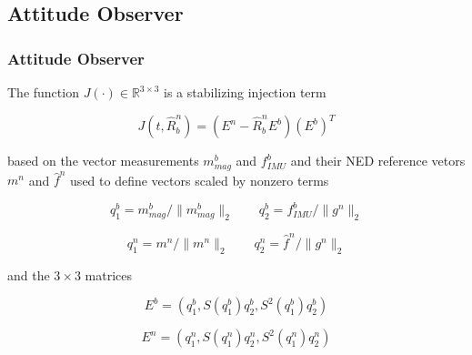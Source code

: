 \documentclass{beamer}
\begin{document}
    \subsection{Attitude Observer}
	\begin{frame}
 		\frametitle{Attitude Observer}
 		The function $J(\cdot) \in  \mathds{R}^{3\times 3}$ is a stabilizing injection term
 		
 		\[ J(t, \hat{R}^n_b)  = (E^n - \hat{R}^n_b E^b)(E^b)^T    \]
 		
 		based on the vector measurements $m^b_{mag}$ and $f^b_{IMU}$  and their NED reference vetors $m^n$ and $\hat{f}^n$ used to define vectors scaled by nonzero terms
 		
 		\[ q_1^b = m^b_{mag}/\|m^b_{mag}\|_2 \qquad q_2^b = f^b_{IMU}/\|g^n\|_2    \]
 		
 		\[ q_1^n = m^n/\|m^n\|_2 \qquad q_2^n = \hat{f}^n/\|g^n\|_2    \]
 		
 		and the $3\times3$ matrices
 		
 		\[ E^b = (q_1^b, S(q^b_1)q_2^b, S^2(q_1^b)q_2^b)    \]
 		
 		\[ E^n = (q_1^n, S(q^n_1)q_2^n, S^2(q_1^n)q_2^n)    \]
	\end{frame}
\end{document}
